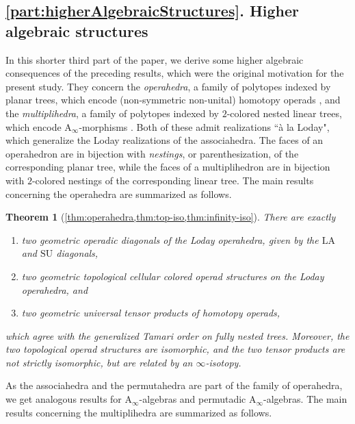 \documentclass{amsart}
\newtheorem*{theorem*}{Theorem}
\theoremstyle{definition}
\newcommand{\SU}{\mathrm{SU}}
\newcommand{\LA}{\mathrm{LA}}
\newcommand{\Ainf}{\ensuremath{\mathrm{A}_\infty}}
\begin{document}

\pagebreak
\subsection*{\cref{part:higherAlgebraicStructures}. Higher algebraic structures}

In this shorter third part of the paper, we derive some higher algebraic consequences of the preceding results, which were the original motivation for the present study.
They concern the \emph{operahedra}, a family of polytopes indexed by planar trees, which encode (non-symmetric non-unital) homotopy operads \cite{LaplanteAnfossi}, and the \emph{multiplihedra}, a family of polytopes indexed by $2$-colored nested linear trees, which encode $\Ainf$-morphisms \cite{LaplanteAnfossiMazuir}.
Both of these admit realizations ``\`a la Loday", which generalize the Loday realizations of the associahedra. 
The faces of an operahedron are in bijection with \emph{nestings}, or parenthesization, of the corresponding planar tree, while the faces of a multiplihedron are in bijection with $2$-colored nestings of the corresponding linear tree. 
The main results concerning the operahedra are summarized as follows. 

\begin{theorem*}[\cref{thm:operahedra,thm:top-iso,thm:infinity-iso}] 
There are exactly 
\begin{enumerate}
	\item two geometric operadic diagonals of the Loday operahedra, given by the $\LA$ and $\SU$ diagonals, 
	\item two geometric topological cellular colored operad structures on the Loday operahedra, and
	\item two geometric universal tensor products of homotopy operads,
\end{enumerate}
which agree with the generalized Tamari order on fully nested trees. 
Moreover, the two topological operad structures are isomorphic, and the two tensor products are not strictly isomorphic, but are related by an $\infty$-isotopy. 
\end{theorem*}

As the associahedra and the permutahedra are part of the family of operahedra, we get analogous results for $\Ainf$-algebras and permutadic $\Ainf$-algebras. 
The main results concerning the multiplihedra are summarized as follows. 
\end{document}
